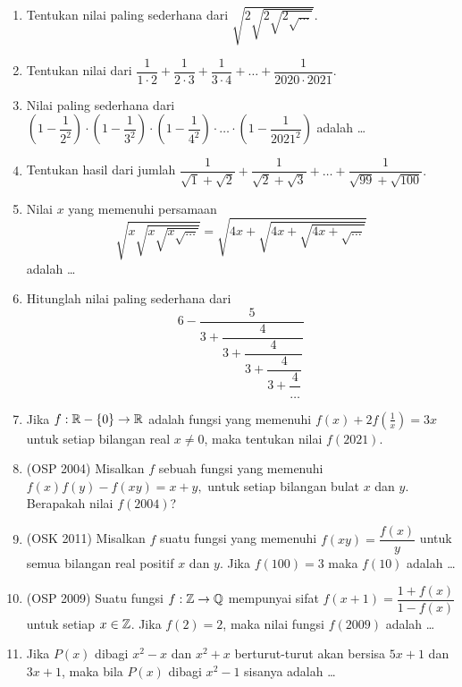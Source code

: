 \documentclass[11pt]{scrartcl}
\begin{document}
\begin{enumerate}
    \item Tentukan nilai paling sederhana dari $\sqrt{2\sqrt{2\sqrt{2\sqrt{\dots}}}}$.
    
    \item Tentukan nilai dari $\dfrac{1}{1\cdot2}+\dfrac{1}{2\cdot 3}+\dfrac{1}{3 \cdot 4}+\dots+\dfrac{1}{2020 \cdot 2021}.$
    
    \item  Nilai paling sederhana dari $\left(1-\dfrac{1}{2^2}\right)\cdot\left(1-\dfrac{1}{3^2}\right)\cdot\left(1-\dfrac{1}{4^2}\right)\cdot\dots\cdot\left(1-\dfrac{1}{2021^2}\right)$ adalah \dots
    
    \item Tentukan hasil dari jumlah $\dfrac{1}{\sqrt{1}+\sqrt{2}}+\dfrac{1}{\sqrt{2}+\sqrt{3}}+\dots+\dfrac{1}{\sqrt{99}+\sqrt{100}}.$
    
    \item Nilai $x$ yang memenuhi persamaan
    $$\sqrt{x\sqrt{x\sqrt{x\sqrt{\dots}}}}=\sqrt{4x+\sqrt{4x+\sqrt{4x+\sqrt{\dots}}}}$$
    adalah \dots
    
    \item Hitunglah nilai paling sederhana dari
    $$6-\dfrac{5}{3+\dfrac{4}{3+\dfrac{4}{3+\dfrac{4}{3+\dfrac{4}{\dots}}}}}$$
    
    \item Jika $f:\mathbb R-\{0\} \rightarrow \mathbb R$ adalah fungsi yang memenuhi $f(x)+2f\left(\frac{1}{x}\right)=3x$ untuk setiap bilangan real $x \neq 0$, maka tentukan nilai $f(2021).$
    
    \item (OSP 2004) Misalkan $f$ sebuah fungsi yang memenuhi $f(x)f(y)-f(xy)=x+y,$ untuk setiap bilangan bulat $x$ dan $y$. Berapakah nilai $f(2004)$?
    
    \item (OSK 2011) Misalkan $f$ suatu fungsi yang memenuhi $f(xy) = \dfrac{f(x)}{y}$ untuk semua bilangan real positif $x$ dan $y$. Jika $f(100)=3$ maka $f(10)$ adalah \dots
    
    \item (OSP 2009) Suatu fungsi $f:\mathbb Z \rightarrow \mathbb Q$ mempunyai sifat $f(x+1)=\dfrac{1+f(x)}{1-f(x)}$ untuk setiap $x \in \mathbb Z$. Jika $f(2)=2$, maka nilai fungsi $f(2009)$ adalah \dots
    
    \item Jika $P(x)$ dibagi $x^2-x$ dan $x^2+x$ berturut-turut akan bersisa $5x+1$ dan $3x+1$, maka bila $P(x)$ dibagi $x^2-1$ sisanya adalah \dots
    

\end{enumerate}
\end{document}
